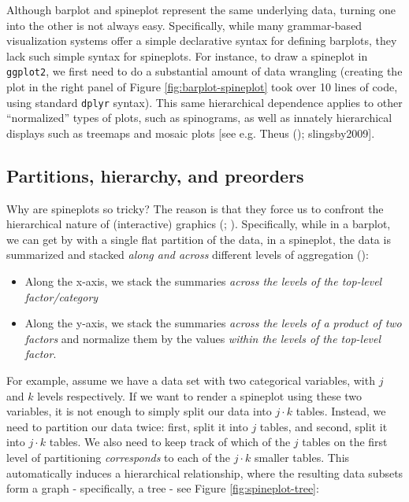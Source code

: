 \documentclass[
]{book}
\providecommand{\tightlist}{%
  \setlength{\itemsep}{0pt}\setlength{\parskip}{0pt}}
\theoremstyle{definition}
\theoremstyle{definition}
\theoremstyle{definition}
\theoremstyle{definition}
\theoremstyle{remark}
\begin{document}
Although barplot and spineplot represent the same underlying data, turning one into the other is not always easy. Specifically, while many grammar-based visualization systems offer a simple declarative syntax for defining barplots, they lack such simple syntax for spineplots. For instance, to draw a spineplot in \texttt{ggplot2}, we first need to do a substantial amount of data wrangling (creating the plot in the right panel of Figure \ref{fig:barplot-spineplot} took over 10 lines of code, using standard \texttt{dplyr} syntax). This same hierarchical dependence applies to other ``normalized'' types of plots, such as spinograms, as well as innately hierarchical displays such as treemaps and mosaic plots {[}see e.g. Theus (); slingsby2009{]}.

\subsection{Partitions, hierarchy, and preorders}\label{hierarchy}

Why are spineplots so tricky? The reason is that they force us to confront the hierarchical nature of (interactive) graphics (; ). Specifically, while in a barplot, we can get by with a single flat partition of the data, in a spineplot, the data is summarized and stacked \emph{along and across} different levels of aggregation ():

\begin{itemize}
\tightlist
\item
  Along the x-axis, we stack the summaries \emph{across the levels of the top-level factor/category}
\item
  Along the y-axis, we stack the summaries \emph{across the levels of a product of two factors} and normalize them by the values \emph{within the levels of the top-level factor}.
\end{itemize}

For example, assume we have a data set with two categorical variables, with \(j\) and \(k\) levels respectively. If we want to render a spineplot using these two variables, it is not enough to simply split our data into \(j \cdot k\) tables. Instead, we need to partition our data twice: first, split it into \(j\) tables, and second, split it into \(j \cdot k\) tables. We also need to keep track of which of the \(j\) tables on the first level of partitioning \emph{corresponds} to each of the \(j \cdot k\) smaller tables. This automatically induces a hierarchical relationship, where the resulting data subsets form a graph - specifically, a tree - see Figure \ref{fig:spineplot-tree}:
\end{document}
